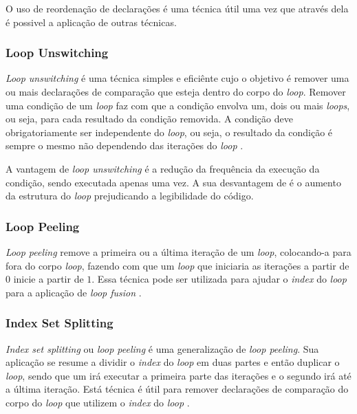 \documentclass[12pt]{article}
\begin{document}
O uso de reordenação de declarações é uma técnica útil uma vez que através dela 
é possivel a aplicação de outras técnicas.

\subsubsection{Loop Unswitching}

\textit{Loop unswitching} é uma técnica simples e eficiênte cujo o objetivo 
é remover uma ou mais declarações de comparação que esteja dentro do
corpo do \textit{loop}.
Remover uma condição de um \textit{loop} faz com que a condição envolva um, dois
ou mais \textit{loops}, ou seja, para cada resultado da condição removida.
A condição deve obrigatoriamente ser independente do \textit{loop}, ou seja, o
resultado da condição é sempre o mesmo não dependendo das iterações do 
\textit{loop} \cite{Ghodrat:2008}.

A vantagem de \textit{loop unswitching} é a redução da frequência da execução
da condição, sendo executada apenas uma vez.
A sua desvantagem de é o aumento da estrutura do
\textit{loop} prejudicando a legibilidade do código.

\subsubsection{Loop Peeling}

\textit{Loop peeling} remove a primeira ou a última iteração de um
\textit{loop}, colocando-a para fora do corpo \textit{loop}, fazendo com que um
\textit{loop} que iniciaria as iterações a partir de $0$ inicie a partir de $1$.
Essa técnica pode ser utilizada para ajudar o \textit{index} do \textit{loop}
para a aplicação de \textit{loop fusion} \cite{Song:2004}.

\subsubsection{Index Set Splitting}

\textit{Index set splitting} ou \textit{loop peeling} é uma generalização de 
\textit{loop peeling}. 
Sua aplicação se resume a dividir o \textit{index} do \textit{loop} em duas
partes e então duplicar o \textit{loop}, sendo que um irá executar a primeira
parte das iterações e o segundo irá até a última iteração.
Está técnica é útil para remover declarações de comparação do corpo do
\textit{loop} que utilizem o \textit{index} do \textit{loop}
\cite{Tasharofi:2010}.
\end{document}
